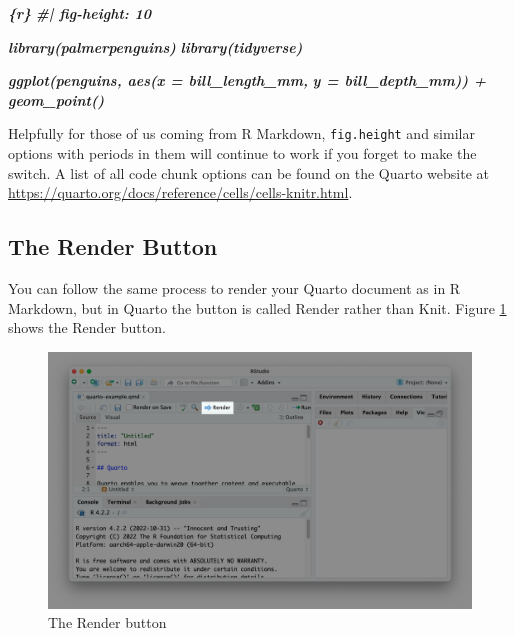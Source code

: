 \documentclass[
]{book}
\newenvironment{Shaded}{\begin{snugshade}}{\end{snugshade}}
\newcommand{\InformationTok}[1]{\textcolor[rgb]{0.56,0.35,0.01}{\textbf{\textit{#1}}}}
\begin{document}
\begin{Shaded}
\begin{Highlighting}[]
\InformationTok{\textasciigrave{}\textasciigrave{}\textasciigrave{}\{r\}}
\InformationTok{\#| fig{-}height: 10}

\InformationTok{library(palmerpenguins)}
\InformationTok{library(tidyverse)}

\InformationTok{ggplot(penguins, aes(x = bill\_length\_mm,}
\InformationTok{                     y = bill\_depth\_mm)) +}
\InformationTok{  geom\_point()}
\InformationTok{\textasciigrave{}\textasciigrave{}\textasciigrave{}}
\end{Highlighting}
\end{Shaded}

Helpfully for those of us coming from R Markdown, \texttt{fig.height} and similar options with periods in them will continue to work if you forget to make the switch. A list of all code chunk options can be found on the Quarto website at \url{https://quarto.org/docs/reference/cells/cells-knitr.html}.

\hypertarget{the-render-button}{%
\subsection*{The Render Button}\label{the-render-button}}

You can follow the same process to render your Quarto document as in R Markdown, but in Quarto the button is called Render rather than Knit. Figure \ref{fig:render-button} shows the Render button.

\begin{figure}
\includegraphics[width=1\linewidth]{assets/render-button} \caption{The Render button}\label{fig:render-button}
\end{figure}
\end{document}
